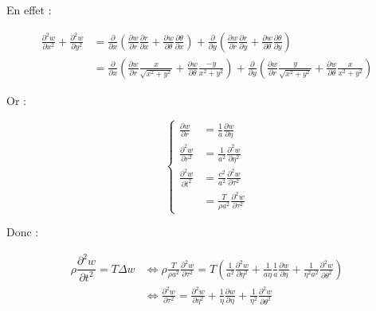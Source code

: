 \documentclass[a4,12pt]{article}
\begin{document}
En effet :

$$
\begin{aligned}
  \frac{\partial^2 w}{\partial x^2} + \frac{\partial^2 w}{\partial y^2} &=
  \frac{\partial}{\partial x} (\frac{\partial w}{\partial r} \frac{\partial r}{\partial x} + \frac{\partial w}{\partial \theta} \frac{\partial \theta}{\partial x}) + \frac{\partial}{\partial y} (\frac{\partial w}{\partial r} \frac{\partial r}{\partial y} + \frac{\partial w}{\partial \theta} \frac{\partial \theta}{\partial y}) \\
  &= \frac{\partial}{\partial x} (\frac{\partial w}{\partial r} \frac{x}{\sqrt{x^2 + y^2}} + \frac{\partial w}{\partial \theta} \frac{-y}{x^2 + y^2}) + \frac{\partial}{\partial y} (\frac{\partial w}{\partial r} \frac{y}{\sqrt{x^2 + y^2}} + \frac{\partial w}{\partial \theta} \frac{x}{x^2 + y^2})
\end{aligned}
$$

Or :

$$
\left\{\begin{aligned}
    \frac{\partial w}{\partial r} &= \frac{1}{a} \frac{\partial w}{\partial \eta} \\
    \frac{\partial^2 w}{\partial r^2} &= \frac{1}{a^2} \frac{\partial^2 w}{\partial \eta^2} \\
    \frac{\partial^2 w}{\partial t^2} &= \frac{c^2}{a^2} \frac{\partial^2 w}{\partial \tau^2} \\
                                      &= \frac{T}{\rho a^2} \frac{\partial^2 w}{\partial \tau^2}
\end{aligned}\right.
$$

Donc :

$$
\begin{aligned}
  \rho \dfrac{\partial^2 w}{\partial t^2} = T \Delta w
  &\Leftrightarrow
  \rho \frac{T}{\rho a^2} \frac{\partial^2 w}{\partial \tau^2} = T(\frac{1}{a^2} \frac{\partial^2 w}{\partial \eta^2} + \frac{1}{a\eta} \frac{1}{a} \frac{\partial w}{\partial \eta} + \frac{1}{\eta^2 a^2} \frac{\partial^2 w}{\partial \theta^2}) \\
  &\Leftrightarrow
  \frac{\partial^2 w}{\partial \tau^2} = \frac{\partial^2 w}{\partial \eta^2} + \frac{1}{\eta} \frac{\partial w}{\partial \eta} + \frac{1}{\eta^2} \frac{\partial^2 w}{\partial \theta^2}
\end{aligned}
$$

\end{document}
